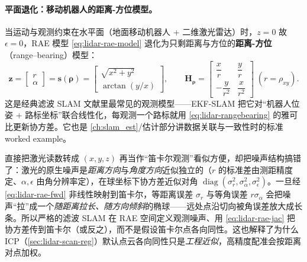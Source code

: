 \paragraph{平面退化：移动机器人的距离-方位模型。}
当运动与观测约束在水平面（地面移动机器人 + 二维激光雷达）时，$z=0$ 故 $\epsilon=0$，RAE 模型 \cref{eq:lidar-rae-model} 退化为只剩距离与方位的\textbf{距离-方位}（range–bearing）模型：
\begin{equation}
  \mathbf z=\begin{bmatrix}r\\\alpha\end{bmatrix}
  =\mathbf s(\boldsymbol\rho)
  =\begin{bmatrix}\sqrt{x^2+y^2}\\\arctan(y/x)\end{bmatrix},
  \qquad
  \mathbf H_{\boldsymbol\rho}=\begin{bmatrix}\dfrac{x}{r}&\dfrac{y}{r}\\[8pt]-\dfrac{y}{r^2}&\dfrac{x}{r^2}\end{bmatrix}
  \;(r=\rho_{xy}).
  \label{eq:lidar-rangebearing}
\end{equation}
这是经典滤波 SLAM 文献里最常见的观测模型——EKF-SLAM 把它对“机器人位姿 + 路标坐标”联合线性化，每观测一个路标就用 \cref{eq:lidar-rangebearing} 的雅可比更新协方差。它也是 \cref{ch:slam_est}/估计部分讲数据关联与一致性时的标准 worked example。

\begin{insight}\label{ins:lidar-rae-noise}
直接把激光读数转成 $(x,y,z)$ 再当作“笛卡尔观测”看似方便，却把噪声结构搞错了：激光的原生噪声是\emph{距离方向}与\emph{角度方向}近似独立的（$r$ 的标准差由测距精度定、$\alpha,\epsilon$ 由角分辨率定），在球坐标下协方差近似对角 $\operatorname{diag}(\sigma_r^2,\sigma_\alpha^2,\sigma_\epsilon^2)$。一旦经 \cref{eq:lidar-rae-fwd} 非线性映射到笛卡尔，等距离误差 $\sigma_r$ 与等角误差 $r\sigma_\alpha$ 会把噪声“拉”成一个\emph{随距离拉长、随方向倾斜}的椭球——远处点沿切向被角误差放大成长条。所以严格的滤波 SLAM 在 RAE 空间定义观测噪声、用 \cref{eq:lidar-rae-jac} 把协方差传到笛卡尔（或反之），而不是假设笛卡尔点各向同性。这也解释了为什么 ICP（\cref{sec:lidar-scan-reg}）默认点云各向同性只是\emph{工程近似}，高精度配准会按距离对点加权。
\end{insight}


